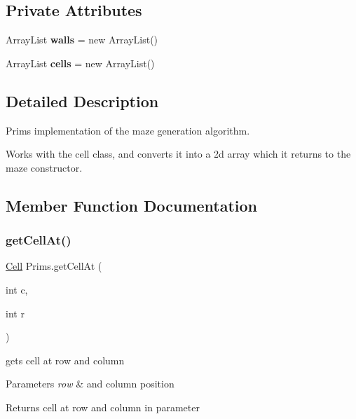 \subsection*{Private Attributes}
\begin{DoxyCompactItemize}
\item 
\mbox{\label{class_prims_a5e19cf37057d8302ba2aa9a06678d33b}} 
Array\+List {\bfseries walls} = new Array\+List()
\item 
\mbox{\label{class_prims_a4e3856df17463d773a054334f3b7fe17}} 
Array\+List {\bfseries cells} = new Array\+List()
\end{DoxyCompactItemize}


\subsection{Detailed Description}
Prim\textquotesingle{}s implementation of the maze generation algorithm. 

Works with the cell class, and converts it into a 2d array which it returns to the maze constructor. 

\subsection{Member Function Documentation}
\mbox{\label{class_prims_a728350565172ad086c4fa5b8a453e419}} 
\subsubsection{\texorpdfstring{getCellAt()}{getCellAt()}}
{\footnotesize\ttfamily \mbox{\hyperlink{class_cell}{Cell}} Prims.\+get\+Cell\+At (\begin{DoxyParamCaption}\item[{int}]{c,  }\item[{int}]{r }\end{DoxyParamCaption})\hspace{0.3cm}{\ttfamily [private]}}



gets cell at row and column 


\begin{DoxyParams}{Parameters}
{\em row} & and column position\\
\hline
\end{DoxyParams}
\begin{DoxyReturn}{Returns}
cell at row and column in parameter 
\end{DoxyReturn}
\mbox{\label{class_prims_af79c48f9584fc1e8e37cf0ef5edd904e}} 
